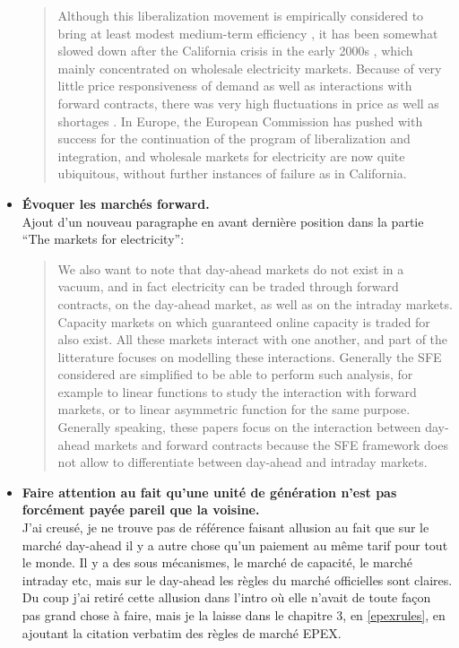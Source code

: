 \documentclass{article}
\begin{document}
\begin{itemize}
\begin{quote}
Although this liberalization movement is empirically considered to bring at least modest medium-term efficiency \cite{fabrizio2007markets}, it has been somewhat slowed down after the California crisis in the early 2000s \cite{jamasb2005electricity}, which mainly concentrated on wholesale electricity markets. Because of very little price responsiveness of demand as well as interactions with forward contracts, there was very high fluctuations in price as well as shortages \cite{borenstein2002trouble}. In Europe, the European Commission has pushed with success for the continuation of the program of liberalization and integration, and wholesale markets for electricity are now quite ubiquitous, without further instances of failure as in California. 
\end{quote}

\item \textbf{Évoquer les marchés forward.}\\

Ajout d'un nouveau paragraphe en avant dernière position dans la partie ``The markets for electricity'':

\begin{quote}
We also want to note that day-ahead markets do not exist in a vacuum, and in fact electricity can be traded through forward contracts, on the day-ahead market, as well as on the intraday markets. Capacity markets on which guaranteed online capacity is traded for also exist. All these markets interact with one another, and part of the litterature focuses on modelling these interactions. Generally the SFE considered are simplified to be able to perform such analysis, for example to linear functions \cite{green1999electricity} to study the interaction with forward markets, or to linear asymmetric function \cite{anderson2012asymmetric} for the same purpose. Generally speaking, these papers focus on the interaction between day-ahead markets and forward contracts because the SFE framework does not allow to differentiate between day-ahead and intraday markets. \\
\end{quote}

\item \textbf{Faire attention au fait qu'une unité de génération n'est pas forcément payée pareil que la voisine.} \\

J'ai creusé, je ne trouve pas de référence faisant allusion au fait que sur le marché day-ahead il y a autre chose qu'un paiement au même tarif pour tout le monde. Il y a des sous mécanismes, le marché de capacité, le marché intraday etc, mais sur le day-ahead les règles du marché officielles sont claires. Du coup j'ai retiré cette allusion dans l'intro où elle n'avait de toute façon pas grand chose à faire, mais je la laisse dans le chapitre 3, en \ref{epexrules}, en ajoutant la citation verbatim des règles de marché EPEX. 


\end{itemize}
\end{document}
